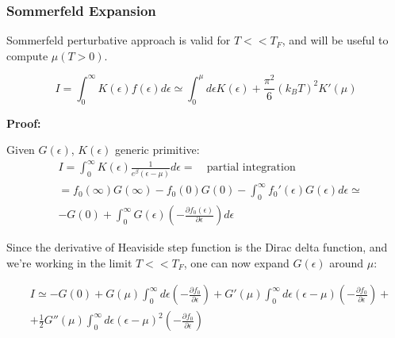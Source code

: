\documentclass{article}
\begin{document}
\subsubsection{Sommerfeld Expansion}

Sommerfeld perturbative approach is valid for $T<<T_F$, and will be useful to compute $\mu(T>0)$.

\begin{tcolorbox}[colframe=gray!50, colback=gray!10, coltitle=black, title=Sommerfeld expansion]

    \begin{equation}
        I=\int_{0}^{\infty}K(\epsilon)f(\epsilon)d\epsilon \simeq \int_0^\mu d\epsilon K(\epsilon)+\frac{\pi^2}{6}(k_BT)^2K'(\mu)
    \end{equation}

\end{tcolorbox}

\textbf{Proof:}

Given $G(\epsilon)$, $K(\epsilon)$ generic primitive:
\begin{equation}
    \begin{aligned}
         & I=\int_0^\infty K(\epsilon)\frac{1}{e^\beta(\epsilon-\mu)}d\epsilon= \quad \text{partial integration}   \\
         & =f_0(\infty)G(\infty)-f_0(0)G(0)-\int_0^\infty f_0'(\epsilon)G(\epsilon)d\epsilon\simeq                 \\
         & -G(0)+\int_0^\infty G(\epsilon)\left(-\frac{\partial f_0(\epsilon)}{\partial \epsilon} \right)d\epsilon
    \end{aligned}
\end{equation}

Since the derivative of Heaviside step function is the Dirac delta function, and we're working in the limit $T<<T_F$,
one can now expand $G(\epsilon)$ around $\mu$:

\begin{equation}
    \begin{aligned}
         & I\simeq -G(0)+G(\mu)\int_0^\infty d\epsilon\left( -\frac{\partial f_0}{\partial \epsilon} \right) +G'(\mu)\int_0^\infty d\epsilon(\epsilon-\mu)\left( -\frac{\partial f_0}{\partial \epsilon} \right) + \\
         & + \frac{1}{2}G''(\mu)\int_0^\infty d\epsilon(\epsilon-\mu)^2\left( -\frac{\partial f_0}{\partial \epsilon} \right)
    \end{aligned}
\end{equation}
\end{document}

